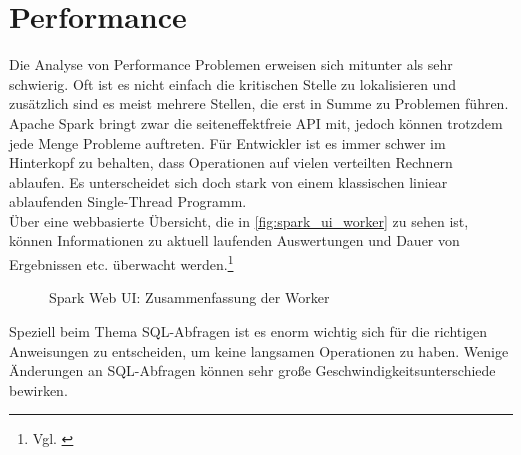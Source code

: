 \newpage
\section{Performance}
Die Analyse von Performance Problemen erweisen sich mitunter als sehr schwierig. Oft ist es nicht einfach die kritischen Stelle zu lokalisieren und zusätzlich sind es meist mehrere Stellen, die erst in Summe zu Problemen führen. Apache Spark bringt zwar die seiteneffektfreie API mit, jedoch können trotzdem jede Menge Probleme auftreten. Für Entwickler ist es immer schwer im Hinterkopf zu behalten, dass Operationen auf vielen verteilten Rechnern ablaufen. Es unterscheidet sich doch stark von einem klassischen liniear ablaufenden Single-Thread Programm.\\ 

\noindent
Über eine webbasierte Übersicht, die in \autoref{fig:spark_ui_worker} zu sehen ist, können Informationen zu aktuell laufenden Auswertungen und Dauer von Ergebnissen etc. überwacht werden.\footnote{Vgl. \cite[12]{AAWS15}}

\begin{figure}[h]
  \centering
  \caption{Spark Web UI: Zusammenfassung der Worker}\label{fig:spark_ui_worker}
\end{figure}

\noindent
Speziell beim Thema SQL-Abfragen ist es enorm wichtig sich für die richtigen Anweisungen zu entscheiden, um keine langsamen Operationen zu haben. 
Wenige Änderungen an SQL-Abfragen können sehr große Geschwindigkeitsunterschiede bewirken.



